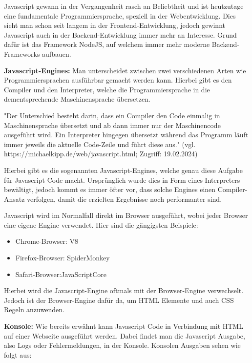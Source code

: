 Javascript gewann in der Vergangenheit rasch an Beliebtheit und ist heutzutage eine fundamentale Programmiersprache, speziell in der Webentwicklung. Dies sieht man schon seit langem in der Frontend-Entwicklung, jedoch gewinnt Javascript auch in der Backend-Entwicklung immer mehr an Interesse. Grund dafür ist das Framework NodeJS, auf welchem  immer mehr moderne Backend-Frameworks aufbauen.

\textbf{Javascript-Engines:}
\newline
Man unterscheidet zwischen zwei verschiedenen Arten wie Programmiersprachen ausführbar gemacht werden kann. Hierbei gibt es den Compiler und den Interpreter, welche die Programmiersprache in die dementsprechende Maschinensprache übersetzen.

"Der Unterschied besteht darin, dass ein Compiler den Code einmalig in Maschinensprache übersetzt und ab dann immer nur der Maschinencode ausgeführt wird. Ein Interpreter hingegen übersetzt während das Programm läuft immer jeweils die aktuelle Code-Zeile und führt diese aus."
\newline
(vgl. https://michaelkipp.de/web/javascript.html; Zugriff: 19.02.2024)

Hierbei gibt es die sogenannten Javascript-Engines, welche genau diese Aufgabe für Javascript Code macht. Ursprünglich wurde dies in Form eines Interpreters bewältigt, jedoch kommt es immer öfter vor, dass solche Engines einen Compiler-Ansatz verfolgen, damit die erzielten Ergebnisse noch performanter sind.

Javascript wird im Normalfall direkt im Browser ausgeführt, wobei jeder Browser eine eigene Engine verwendet. Hier sind die gängigsten Beispiele:

\begin{itemize}
  \item Chrome-Browser: V8
  \item Firefox-Browser: SpiderMonkey
  \item Safari-Browser:JavaScriptCore
\end{itemize}

Hierbei wird die Javascript-Engine oftmals mit der Browser-Engine verwechselt. Jedoch ist der Browser-Engine dafür da, um HTML Elemente und auch CSS Regeln anzuwenden. 

\textbf{Konsole:}
\newline
Wie bereits erwähnt kann Javascript Code in Verbindung mit HTML auf einer Webseite ausgeführt werden. Dabei findet man die Javascript Ausgabe, also Logs oder Fehlermeldungen, in der Konsole. Konsolen Ausgaben sehen wie folgt aus:


